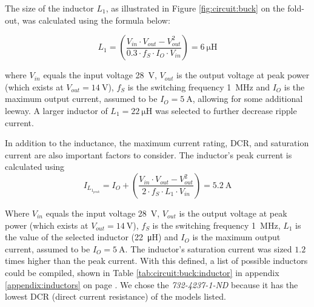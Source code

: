 The   size    of   the    inductor   $L_1$,    as   illustrated    in   Figure
\ref{fig:circuit:buck}  on  the fold-out,  was  calculated  using the  formula
below:

\begin{equation}
    L_1 = \left( \frac{V_{in} \cdot V_{out} - V_{out}^2}{0.3 \cdot f_S \cdot I_O \cdot V_{in}} \right) = \SI{6}{\micro\henry}
    \label{eq:circuit:buck:inductor}
\end{equation}

where  $V_{in}$ equals  the  input voltage  \SI{28}{\volt},  $V_{out}$ is  the
output voltage  at peak  power (which exists  at $V_{out}  = \SI{14}{\volt}$),
$f_S$ is the switching frequency  \SI{1}{\mega\hertz} and $I_O$ is the maximum
output  current, assumed  to be  $I_O  = \SI{5}{\ampere}$,  allowing for  some
additional leeway.   A larger  inductor of  $L_1 =  \SI{22}{\micro\henry}$ was
selected to further decrease ripple current.

In addition to the inductance, the maximum current rating, DCR, and saturation
current are also important factors to consider. The inductor's peak current is
calculated using
\begin{equation}
    I_{L_{1_{peak}}} = I_O + \left( \frac{V_{in} \cdot V_{out} - V_{out}^2}{2 \cdot f_S \cdot L_1 \cdot V_{in}} \right) = \SI{5.2}{\ampere}
    \label{eq:circuit:buck:inductor_peak}
\end{equation}

Where  $V_{in}$ equals  the  input voltage  \SI{28}{\volt},  $V_{out}$ is  the
output voltage  at peak  power (which exists  at $V_{out}  = \SI{14}{\volt}$),
$f_S$ is  the switching frequency  \SI{1}{\mega\hertz}, $L_1$ is the  value of
the selected inductor (\SI{22}{\micro\henry}) and  $I_O$ is the maximum output
current, assumed  to be  $I_O =  \SI{5}{\ampere}$.  The  inductor's saturation
current  was  sized  $1.2$  times  higher than  the  peak  current. With  this
defined,  a list  of  possible inductors  could be  compiled,  shown in  Table
\ref{tab:circuit:buck:inductor} in  appendix \ref{appendix:inductors}  on page
\pageref{appendix:inductors}.   We chose  the \emph{732-4237-1-ND}  because it
has the lowest DCR (direct current resistance) of the models listed.
